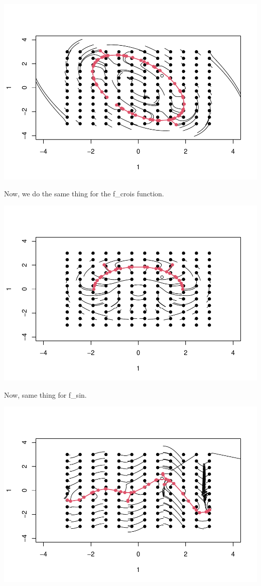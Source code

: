 \documentclass[
]{article}
\begin{document}
\includegraphics{Problemsetrmd_files/figure-latex/unnamed-chunk-13-1.pdf}

Now, we do the same thing for the f\_crois function.

\includegraphics{Problemsetrmd_files/figure-latex/unnamed-chunk-16-1.pdf}

Now, same thing for f\_sin.

\includegraphics{Problemsetrmd_files/figure-latex/unnamed-chunk-19-1.pdf}
\end{document}
